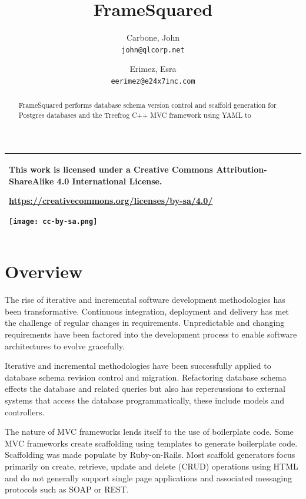 \documentclass[]{article}
\title{FrameSquared}
\author{
	  Carbone, John\\
	\texttt{john@qlcorp.net}
	\and
	Erimez, Esra\\
	\texttt{eerimez@e24x7inc.com}
}
\begin{document}
\maketitle
\begin{tabular}{|p{}|}
	\hline
	\begin{center}
		This work is licensed under a Creative Commons Attribution-ShareAlike 4.0 International License.
	\end{center}
\begin{center}
	\url{https://creativecommons.org/licenses/by-sa/4.0/}
\end{center}
	\begin{center}
		\texttt{[image: cc-by-sa.png]}
	\end{center}\\
	\hline
\end{tabular}

\begin{abstract}
FrameSquared performs database schema version control and scaffold generation for Postgres databases and the Treefrog C++ MVC framework using YAML to 
\end{abstract}


\section{Overview}
The rise of iterative and incremental software development methodologies has been transformative. Continuous integration\cite{ci}, deployment and delivery\cite{cd,cidd} has met the challenge of regular changes in requirements. Unpredictable and changing requirements\cite{bea} have been factored into the development process to enable software architectures to evolve gracefully.

Iterative and incremental methodologies have been successfully applied to database schema revision control and migration\cite{rd}. Refactoring database schema effects the database and related queries but also has repercussions to external systems that access the database programmatically, these include models and controllers. 

The nature of MVC frameworks lends itself to the use of boilerplate code. Some MVC frameworks create scaffolding using templates to generate boilerplate code. Scaffolding was made populate by Ruby-on-Rails. Most scaffold generators focus primarily on create, retrieve, update and delete (CRUD) operations using HTML\cite{scaffold,vsscaffold} and do not generally support single page applications\cite{spa} and associated messaging protocols such as SOAP or REST.
\end{document}
